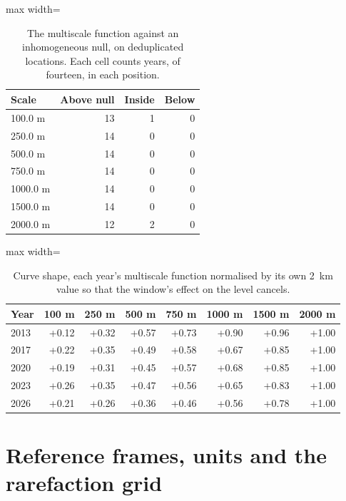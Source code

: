 \documentclass[fleqn,10pt]{wlpeerj}
\begin{document}
\begin{table}[H]
\centering
\caption{The multiscale function against an inhomogeneous null, on
deduplicated locations. Each cell counts years, of fourteen, in each position.}
\label{si:lnull}
\small
\begin{adjustbox}{max width=\linewidth}
\begin{tabular}{lrrr}
\toprule
Scale & Above null & Inside & Below \\
\midrule
100.0 m & 13 & 1 & 0 \\
250.0 m & 14 & 0 & 0 \\
500.0 m & 14 & 0 & 0 \\
750.0 m & 14 & 0 & 0 \\
1000.0 m & 14 & 0 & 0 \\
1500.0 m & 14 & 0 & 0 \\
2000.0 m & 12 & 2 & 0 \\
\bottomrule
\end{tabular}
\end{adjustbox}
\end{table}

\begin{table}[H]
\centering
\caption{Curve shape, each year's multiscale function normalised by its own
\SI{2}{\kilo\meter} value so that the window's effect on the level cancels.}
\label{si:lshape}
\footnotesize
\setlength{\tabcolsep}{4pt}
\begin{adjustbox}{max width=\linewidth}
\begin{tabular}{lrrrrrrr}
\toprule
Year & 100 m & 250 m & 500 m & 750 m & 1000 m & 1500 m & 2000 m \\
\midrule
2013 & +0.12 & +0.32 & +0.57 & +0.73 & +0.90 & +0.96 & +1.00 \\
2017 & +0.22 & +0.35 & +0.49 & +0.58 & +0.67 & +0.85 & +1.00 \\
2020 & +0.19 & +0.31 & +0.45 & +0.57 & +0.68 & +0.85 & +1.00 \\
2023 & +0.26 & +0.35 & +0.47 & +0.56 & +0.65 & +0.83 & +1.00 \\
2026 & +0.21 & +0.26 & +0.36 & +0.46 & +0.56 & +0.78 & +1.00 \\
\bottomrule
\end{tabular}
\end{adjustbox}
\end{table}

\section{Reference frames, units and the rarefaction grid}
\label{si:frames}
\end{document}
